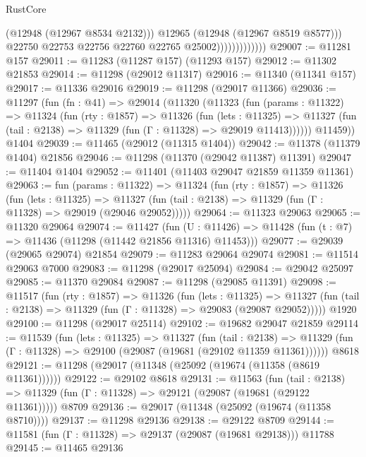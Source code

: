 \begin{lexlean}{RustCore}
\begin{coremodule}
                                  (@12948 (@12967 @8534 @2132)))
                                @12965
                                (@12948 (@12967 @8519 @8577)))
                              @22750
                              @22753
                              @22756
                              @22760
                              @22765
                              @25002)))))))))))))
@29007 := @11281 @157
@29011 := @11283 (@11287 @157) (@11293 @157)
@29012 := @11302 @21853
@29014 := @11298 (@29012 @11317)
@29016 := @11340 (@11341 @157)
@29017 := @11336 @29016
@29019 := @11298 (@29017 @11366)
@29036 := @11297
    (fun (fn : @41) =>
    @29014
      (@11320
        (@11323
          (fun (params : @11322) =>
          @11324
            (fun (rty : @1857) =>
            @11326
              (fun (lets : @11325) =>
              @11327 (fun (tail : @2138) => @11329 (fun (Γ : @11328) => @29019 @11413))))))
        @11459))
    @1404
@29039 := @11465 (@29012 (@11315 @1404))
@29042 := @11378 (@11379 @1404) @21856
@29046 := @11298 (@11370 (@29042 @11387) @11391)
@29047 := @11404 @1404
@29052 := @11401 (@11403 @29047 @21859 @11359 @11361)
@29063 := fun (params : @11322) =>
  @11324
    (fun (rty : @1857) =>
    @11326
      (fun (lets : @11325) =>
      @11327 (fun (tail : @2138) => @11329 (fun (Γ : @11328) => @29019 (@29046 @29052)))))
@29064 := @11323 @29063
@29065 := @11320 @29064
@29074 := @11427
    (fun (U : @11426) => @11428 (fun (t : @7) => @11436 (@11298 (@11442 @21856 @11316) @11453)))
@29077 := @29039 (@29065 @29074) @21854
@29079 := @11283 @29064 @29074
@29081 := @11514 @29063 @7000
@29083 := @11298 (@29017 @25094)
@29084 := @29042 @25097
@29085 := @11370 @29084
@29087 := @11298 (@29085 @11391)
@29098 := @11517
    (fun (rty : @1857) =>
    @11326
      (fun (lets : @11325) =>
      @11327 (fun (tail : @2138) => @11329 (fun (Γ : @11328) => @29083 (@29087 @29052)))))
    @1920
@29100 := @11298 (@29017 @25114)
@29102 := @19682 @29047 @21859
@29114 := @11539
    (fun (lets : @11325) =>
    @11327
      (fun (tail : @2138) =>
      @11329 (fun (Γ : @11328) => @29100 (@29087 (@19681 (@29102 @11359 @11361))))))
    @8618
@29121 := @11298 (@29017 (@11348 (@25092 (@19674 (@11358 (@8619 @11361))))))
@29122 := @29102 @8618
@29131 := @11563
    (fun (tail : @2138) => @11329 (fun (Γ : @11328) => @29121 (@29087 (@19681 (@29122 @11361)))))
    @8709
@29136 := @29017 (@11348 (@25092 (@19674 (@11358 @8710))))
@29137 := @11298 @29136
@29138 := @29122 @8709
@29144 := @11581 (fun (Γ : @11328) => @29137 (@29087 (@19681 @29138))) @11788
@29145 := @11465 @29136

\end{coremodule}
\end{lexlean}
